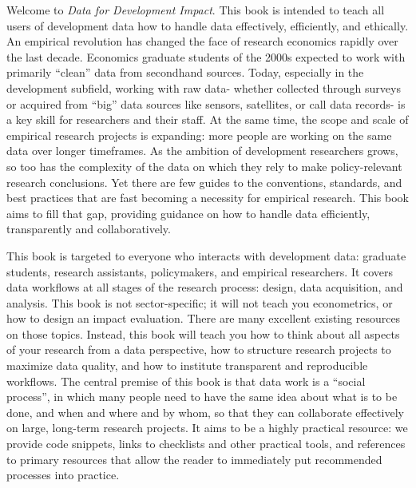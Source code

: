 \begin{fullwidth}
Welcome to \textit{Data for Development Impact}.
This book is intended to teach all users of development data 
how to handle data effectively, efficiently, and ethically. 
An empirical revolution has changed the face of research economics rapidly over the last decade. 
Economics graduate students of the 2000s expected to work with primarily ``clean'' data from secondhand sources. 
Today, especially in the development subfield, working with raw data- 
whether collected through surveys or acquired from ``big'' data sources like sensors, satellites, or call data records- 
is a key skill for researchers and their staff. 
At the same time, the scope and scale of empirical research projects is expanding: 
more people are working on the same data over longer timeframes. 
As the ambition of development researchers grows, so too has the complexity of the data
on which they rely to make policy-relevant research conclusions. 
Yet there are few guides to the conventions, standards, and best practices 
that are fast becoming a necessity for empirical research.
This book aims to fill that gap, providing guidance on how to handle data efficiently, transparently and collaboratively. 

This book is targeted to everyone who interacts with development data: 
graduate students, research assistants, policymakers, and empirical researchers. 
It covers data workflows at all stages of the research process: design, data acquisition, and analysis.
This book is not sector-specific; it will not teach you econometrics, or how to design an impact evaluation. 
There are many excellent existing resources on those topics. 
Instead, this book will teach you how to think about all aspects of your research from a data perspective, 
how to structure research projects to maximize data quality, 
and how to institute transparent and reproducible workflows. 
The central premise of this book is that data work is a ``social process'',
in which many people need to have the same idea about what is to be done, and when and where and by whom,
so that they can collaborate effectively on large, long-term research projects.
It aims to be a highly practical resource: we provide code snippets, links to checklists and other practical tools, 
and references to primary resources that allow the reader to immediately put recommended processes into practice. 


\end{fullwidth}

